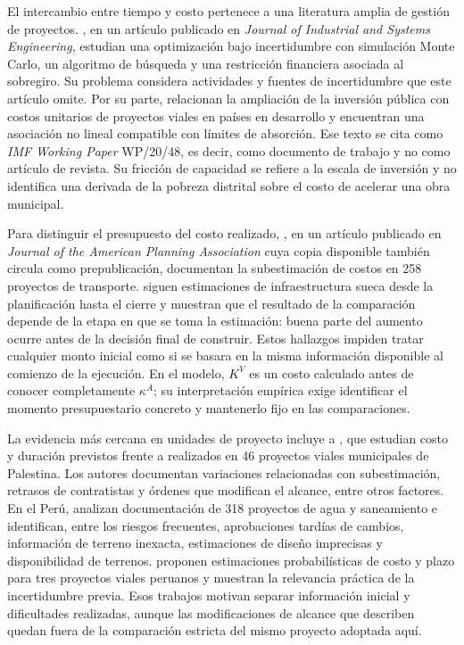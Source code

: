 \documentclass[11pt]{article}
\newcommand{\KV}{K^{V}}
\newcommand{\kA}{\kappa^{A}}
\begin{document}
El intercambio entre tiempo y costo pertenece a una literatura amplia de gestión de proyectos. \citet{mohammadi2022}, en un artículo publicado en \emph{Journal of Industrial and Systems Engineering}, estudian una optimización bajo incertidumbre con simulación Monte Carlo, un algoritmo de búsqueda y una restricción financiera asociada al sobregiro. Su problema considera actividades y fuentes de incertidumbre que este artículo omite. Por su parte, \citet{gurara2020} relacionan la ampliación de la inversión pública con costos unitarios de proyectos viales en países en desarrollo y encuentran una asociación no lineal compatible con límites de absorción. Ese texto se cita como \emph{IMF Working Paper} WP/20/48, es decir, como documento de trabajo y no como artículo de revista. Su fricción de capacidad se refiere a la escala de inversión y no identifica una derivada de la pobreza distrital sobre el costo de acelerar una obra municipal.

Para distinguir el presupuesto del costo realizado, \citet{flyvbjerg2002}, en un artículo publicado en \emph{Journal of the American Planning Association} cuya copia disponible también circula como prepublicación, documentan la subestimación de costos en 258 proyectos de transporte. \citet{eliasson2025} siguen estimaciones de infraestructura sueca desde la planificación hasta el cierre y muestran que el resultado de la comparación depende de la etapa en que se toma la estimación: buena parte del aumento ocurre antes de la decisión final de construir. Estos hallazgos impiden tratar cualquier monto inicial como si se basara en la misma información disponible al comienzo de la ejecución. En el modelo, $\KV$ es un costo calculado antes de conocer completamente $\kA$; su interpretación empírica exige identificar el momento presupuestario concreto y mantenerlo fijo en las comparaciones.

La evidencia más cercana en unidades de proyecto incluye a \citet{issa2022}, que estudian costo y duración previstos frente a realizados en 46 proyectos viales municipales de Palestina. Los autores documentan variaciones relacionadas con subestimación, retrasos de contratistas y órdenes que modifican el alcance, entre otros factores. En el Perú, \citet{julca2025} analizan documentación de 318 proyectos de agua y saneamiento e identifican, entre los riesgos frecuentes, aprobaciones tardías de cambios, información de terreno inexacta, estimaciones de diseño imprecisas y disponibilidad de terrenos. \citet{ariza2025} proponen estimaciones probabilísticas de costo y plazo para tres proyectos viales peruanos y muestran la relevancia práctica de la incertidumbre previa. Esos trabajos motivan separar información inicial y dificultades realizadas, aunque las modificaciones de alcance que describen quedan fuera de la comparación estricta del mismo proyecto adoptada aquí.
\end{document}
